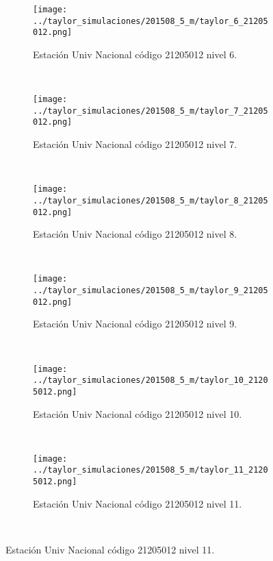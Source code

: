 \begin{figure}[H]\ContinuedFloat
\centering
\begin{subfigure}[normla]{0.4\textwidth}
\caption{Estación Univ Nacional  código 21205012 nivel 6.}
\texttt{[image: ../taylor\_simulaciones/201508\_5\_m/taylor\_6\_21205012.png]}
\end{subfigure}
~
\begin{subfigure}[normla]{0.4\textwidth}
\caption{Estación Univ Nacional  código 21205012 nivel 7.}
\texttt{[image: ../taylor\_simulaciones/201508\_5\_m/taylor\_7\_21205012.png]}
\end{subfigure}
~
\begin{subfigure}[normla]{0.4\textwidth}
\caption{Estación Univ Nacional  código 21205012 nivel 8.}
\texttt{[image: ../taylor\_simulaciones/201508\_5\_m/taylor\_8\_21205012.png]}
\end{subfigure}
~
\begin{subfigure}[normla]{0.4\textwidth}
\caption{Estación Univ Nacional  código 21205012 nivel 9.}
\texttt{[image: ../taylor\_simulaciones/201508\_5\_m/taylor\_9\_21205012.png]}
\end{subfigure}
~
\begin{subfigure}[normla]{0.4\textwidth}
\caption{Estación Univ Nacional  código 21205012 nivel 10.}
\texttt{[image: ../taylor\_simulaciones/201508\_5\_m/taylor\_10\_21205012.png]}
\end{subfigure}
~
\begin{subfigure}[normla]{0.4\textwidth}
\caption{Estación Univ Nacional  código 21205012 nivel 11.}
\texttt{[image: ../taylor\_simulaciones/201508\_5\_m/taylor\_11\_21205012.png]}
\end{subfigure}
~
\end{figure}
           
